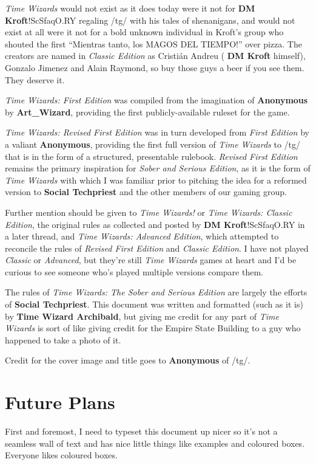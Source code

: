 \documentclass[twoside]{article}
\newcommand{\twsse}{\emph{Time Wizards: The Sober and Serious Edition}}
\newcommand{\tw}{\emph{Time Wizards}}
\newcommand{\sse}{\emph{Sober and Serious Edition}}
\newcommand{\rfe}{\emph{Revised First Edition}}
\newcommand{\anon}[1][]{{\color{anongreen} \textbf{Anonymous}#1}}
\newcommand{\namefag}[2][]{{\color{anongreen} \textbf{#2}#1}}
\begin{document}
\tw{} would not exist as it does today were it not for \namefag[!ScSfaqO.RY]{DM Kroft} regaling
/tg/ with his tales of shenanigans, and would not exist at all were it not for a bold unknown
individual in Kroft's group who shouted the first ``Mientras tanto, los MAGOS DEL TIEMPO!'' over
pizza. The creators are named in \emph{Classic Edition} as Cristi\'{a}n Andreu (\namefag{DM
Kroft} himself), Gonzalo Jimenez and Alain Raymond, so buy those guys a beer if you see them.
They deserve it.

\emph{Time Wizards: First Edition} was compiled from the imagination of \anon{} by
\namefag{Art\_Wizard}, providing the first publicly-available ruleset for the game.

\emph{Time Wizards: Revised First Edition} was in turn developed from \emph{First Edition} by a
valiant \anon{}, providing the first full version of \tw{} to /tg/ that is in the form of a
structured, presentable rulebook. \rfe{} remains the primary inspiration for \sse{}, as it is the
form of \tw{} with which I was familiar prior to pitching the idea for a reformed version to
\namefag{Social Techpriest} and the other members of our gaming group.

Further mention should be given to \emph{Time Wizards!} or \emph{Time Wizards: Classic Edition},
the original rules as collected and posted by \namefag[!ScSfaqO.RY]{DM Kroft} in a later thread,
and \emph{Time Wizards: Advanced Edition}, which attempted to reconcile the rules of \rfe{} and
\emph{Classic Edition}. I have not played \emph{Classic} or \emph{Advanced}, but they're still
\tw{} games at heart and I'd be curious to see someone who's played multiple versions compare
them.

The rules of \twsse{} are largely the efforts of \namefag{Social Techpriest}. This document was
written and formatted (such as it is) by \namefag{Time Wizard Archibald}, but giving me credit
for any part of \tw{} is sort of like giving credit for the Empire State Building to a guy who
happened to take a photo of it.

Credit for the cover image and title goes to \anon{} of /tg/.

\section{Future Plans}
First and foremost, I need to typeset this document up nicer so it's not a seamless wall of text
and has nice little things like examples and coloured boxes. Everyone likes coloured boxes.
\end{document}
